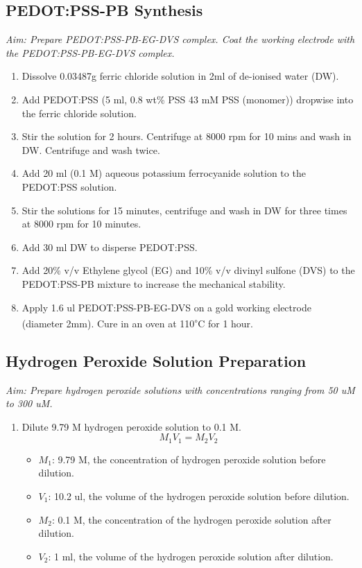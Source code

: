 \begin{appendices}
\subsection{PEDOT:PSS-PB Synthesis}
\textit{Aim: Prepare PEDOT:PSS-PB-EG-DVS complex. Coat the working electrode with the PEDOT:PSS-PB-EG-DVS complex.}
\begin{enumerate}
    \item Dissolve 0.03487g ferric chloride solution in 2ml of de-ionised water (DW).
    \item 	Add PEDOT:PSS (5 ml, 0.8 wt\% PSS 43 mM PSS (monomer)) dropwise into the ferric chloride solution.
    \item Stir the solution for 2 hours. Centrifuge at 8000 rpm for 10 mins and wash in DW. Centrifuge and wash twice.
    \item Add 20 ml (0.1 M) aqueous potassium ferrocyanide solution to the PEDOT:PSS solution.
    \item Stir the solutions for 15 minutes, centrifuge and wash in DW for three times at 8000 rpm for 10 minutes.
    \item Add 30 ml DW to disperse PEDOT:PSS.
    \item Add 20\% v/v Ethylene glycol (EG) and 10\% v/v divinyl sulfone (DVS) to the PEDOT:PSS-PB mixture to increase the mechanical stability.
    \item Apply 1.6 ul PEDOT:PSS-PB-EG-DVS on a gold working electrode (diameter 2mm). Cure in an oven at 110\textsuperscript{$\circ$}C for 1 hour.
\end{enumerate}
\subsection{Hydrogen Peroxide Solution Preparation}
\textit{Aim: Prepare hydrogen peroxide solutions with concentrations ranging from 50 uM to 300 uM.}
\begin{enumerate}
    \item Dilute 9.79 M hydrogen peroxide 
    solution to 0.1 M.
    \[M_{1}V_{1} = M_{2}V_{2}\]
    \begin{itemize}
        \item $M_1$: 9.79 M, the concentration of hydrogen peroxide solution before dilution.
        \item $V_1$: 10.2 ul, the volume of the hydrogen peroxide solution before dilution.
        \item $M_2$: 0.1 M, the concentration of the hydrogen peroxide solution after dilution.
        \item $V_2$: 1 ml, the volume of the hydrogen peroxide solution after dilution.
    \end{itemize}
    

\end{enumerate}
\end{appendices}
